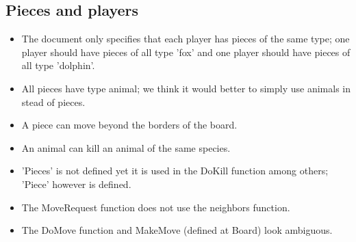 \documentclass[a4paper,11pt]{article}
\begin{document}
    \subsection{Pieces and players}
    \begin{itemize}
        \item The document only specifies that each player has pieces of the same type; one player should have pieces of all type 'fox' and one player should have pieces of all type 'dolphin'.
        \item All pieces have type animal; we think it would better to simply use animals in stead of pieces.
        \item A piece can move beyond the borders of the board.
        \item An animal can kill an animal of the same species.
        \item 'Pieces' is not defined yet it is used in the DoKill function among others; 'Piece' however is defined.
        \item The MoveRequest function does not use the neighbors function.
        \item The DoMove function and MakeMove (defined at Board) look ambiguous.
    \end{itemize}
\end{document}
